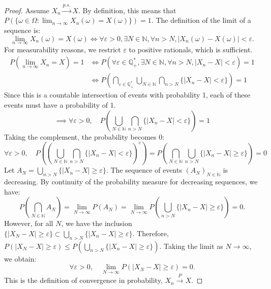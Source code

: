 \begin{proof}
Assume $X_n \xrightarrow{p.s.} X$. By definition, this means that $P(\{\omega \in \Omega : \lim_{n \to \infty} X_n(\omega) = X(\omega)\}) = 1$.
The definition of the limit of a sequence is:
\[
\lim_{n \to \infty} X_n(\omega) = X(\omega) \iff \forall \varepsilon > 0, \exists N \in \mathbb{N}, \forall n > N, |X_n(\omega) - X(\omega)| < \varepsilon.
\]
For measurability reasons, we restrict $\varepsilon$ to positive rationals, which is sufficient.
\begin{align*}
    P(\lim_{n \to \infty} X_n = X) = 1 &\iff P\left(\forall \varepsilon \in \mathbb{Q}_+^*, \exists N \in \mathbb{N}, \forall n > N, |X_n - X| < \varepsilon\right) = 1 \\
    &\iff P\left(\bigcap_{\varepsilon \in \mathbb{Q}_+^*} \bigcup_{N \in \mathbb{N}} \bigcap_{n > N} \{|X_n - X| < \varepsilon\}\right) = 1
\end{align*}
Since this is a countable intersection of events with probability 1, each of these events must have a probability of 1.
\[
\implies \forall \varepsilon > 0, \quad P\left(\bigcup_{N \in \mathbb{N}} \bigcap_{n > N} \{|X_n - X| < \varepsilon\}\right) = 1
\]
Taking the complement, the probability becomes 0:
\[
\forall \varepsilon > 0, \quad P\left(\left(\bigcup_{N \in \mathbb{N}} \bigcap_{n > N} \{|X_n - X| < \varepsilon\}\right)^c\right) = P\left(\bigcap_{N \in \mathbb{N}} \bigcup_{n > N} \{|X_n - X| \geq \varepsilon\}\right) = 0
\]
Let $A_N = \bigcup_{n > N} \{|X_n - X| \geq \varepsilon\}$. The sequence of events $(A_N)_{N \in \mathbb{N}}$ is decreasing. By continuity of the probability measure for decreasing sequences, we have:
\[
P\left(\bigcap_{N \in \mathbb{N}} A_N\right) = \lim_{N \to \infty} P(A_N) = \lim_{N \to \infty} P\left(\bigcup_{n > N} \{|X_n - X| \geq \varepsilon\}\right) = 0.
\]
However, for all $N$, we have the inclusion $\{|X_N - X| \geq \varepsilon\} \subset \bigcup_{n > N} \{|X_n - X| \geq \varepsilon\}$.
Therefore, $P(|X_N - X| \geq \varepsilon) \leq P(\bigcup_{n > N} \{|X_n - X| \geq \varepsilon\})$. Taking the limit as $N \to \infty$, we obtain:
\[
\forall \varepsilon > 0, \quad \lim_{N \to \infty} P(|X_N - X| \geq \varepsilon) = 0.
\]
This is the definition of convergence in probability, $X_n \xrightarrow{P} X$.
\end{proof}

